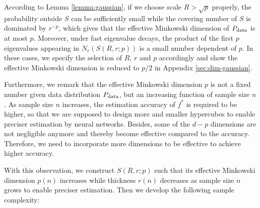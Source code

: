 According to Lemma \ref{lemma:gaussian}, if we choose scale $R>\sqrt{p}$ properly, the probability outside $S$ can be sufficiently small while the covering number of $S$ is dominated by $r^{-p}$, which gives that the effective Minkowski dimension of $P_{\rm data}$ is at most $p$. Moreover, under fast eigenvalue decays, the product of the first $p$ eigenvalues appearing in $N_r(S(R,r;p))$ is a small number dependent of $p$. In these cases, we specify the selection of $R$, $r$ and $p$ accordingly and show the effective Minkowski dimension is reduced to $p/2$ in Appendix \ref{sec:dim-gaussian}. 

Furthermore, we remark that the effective Minkowski dimension $p$  is not a fixed number given data distribution $P_{\rm data}$, but an increasing function of sample size $n$. As sample size $n$ increases, the estimation accuracy of $f^*$ is required to be higher, so that we are supposed to design more and smaller hypercubes to enable preciser estimation by neural networks. Besides, some of the $d-p$ dimensions are not negligible anymore and thereby become effective compared to the accuracy. Therefore, we need to incorporate more dimensions to be effective to achieve higher accuracy. 



With this observation, we construct $S(R,r;p)$ such that its effective Minkowski dimension $p(n)$ increases while thickness $r(n)$ decreases as sample size $n$ grows to enable preciser estimation. Then we develop the following sample complexity:

